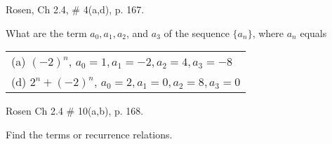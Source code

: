 \documentclass[11pt]{exam}
\begin{document}
\begin{questions}

\question[4]  Rosen, Ch 2.4, \# 4(a,d), p. 167.
\begin{solution}
What are the term $a_0, a_1, a_2$, and $a_3$ of the sequence $\{a_n\}$, where $a_n$ equals \\

\begin{tabular}{l}
  (a) $(-2)^n$, $a_0 = 1, a_1 = -2, a_2 = 4, a_3 = -8$ \\
  (d) $2^n + (-2)^n$, $a_0 = 2, a_1 = 0, a_2 = 8, a_3 = 0$ \\
\end{tabular}
\end{solution}


\question[6] Rosen Ch 2.4 \# 10(a,b), p. 168.
\begin{solution}
Find the terms or recurrence relations.
\end{solution}


\end{questions}
\end{document}
